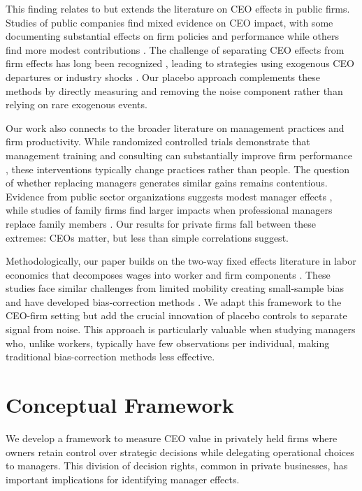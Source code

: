 \documentclass[11pt,a4paper]{article}
\begin{document}
This finding relates to but extends the literature on CEO effects in public firms. Studies of public companies find mixed evidence on CEO impact, with some documenting substantial effects on firm policies and performance \citep{Bertrand2003-io, bennedsen2020ceos} while others find more modest contributions \citep{fee2013managers}. The challenge of separating CEO effects from firm effects has long been recognized \citep{Bertrand2003-io}, leading to strategies using exogenous CEO departures \citep{bennedsen2020ceos} or industry shocks \citep{metcalfe2023managers}. Our placebo approach complements these methods by directly measuring and removing the noise component rather than relying on rare exogenous events.

Our work also connects to the broader literature on management practices and firm productivity. While randomized controlled trials demonstrate that management training and consulting can substantially improve firm performance \citep{bloom2013does}, these interventions typically change practices rather than people. The question of whether replacing managers generates similar gains remains contentious. Evidence from public sector organizations suggests modest manager effects \citep{fenizia2022managers, janke2024role}, while studies of family firms find larger impacts when professional managers replace family members \citep{bennedsen2007inside}. Our results for private firms fall between these extremes: CEOs matter, but less than simple correlations suggest.

Methodologically, our paper builds on the two-way fixed effects literature in labor economics that decomposes wages into worker and firm components \citep{Abowd1999Econometrica, Card2018JoLE}. These studies face similar challenges from limited mobility creating small-sample bias \citep{andrews2008high} and have developed bias-correction methods \citep{Bonhomme2023-dx, gaure2014correlation}. We adapt this framework to the CEO-firm setting but add the crucial innovation of placebo controls to separate signal from noise. This approach is particularly valuable when studying managers who, unlike workers, typically have few observations per individual, making traditional bias-correction methods less effective.

\section{Conceptual Framework}

We develop a framework to measure CEO value in privately held firms where owners retain control over strategic decisions while delegating operational choices to managers. This division of decision rights, common in private businesses, has important implications for identifying manager effects.
\end{document}
